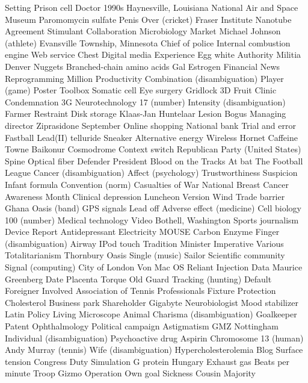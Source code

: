 Setting  Prison cell  Doctor  
1990s  Haynesville, Louisiana  National Air and Space Museum  
Paromomycin sulfate  Penis  Over (cricket)  
Fraser Institute  Nanotube  Agreement  
Stimulant  Collaboration  Microbiology  
Market  Michael Johnson (athlete)  Evansville Township, Minnesota  
Chief of police  Internal combustion engine  Web service  
Chest  Digital media  Experience  
Egg white  Authority  Militia  
Denver Nuggets  Branched-chain amino acids  Gal  
Estrogen  Financial News  Reprogramming  
Million  Productivity  Combination (disambiguation)  
Player (game)  Poster  Toolbox  
Somatic cell  Eye surgery  Gridlock  
3D  Fruit  Clinic  
Condemnation  3G  Neurotechnology  
17 (number)  Intensity (disambiguation)  Farmer  
Restraint  Disk storage  Klaas-Jan Huntelaar  
Lesion  Bogus  Managing director  
Ziprasidone  September  Online shopping  
National bank  Trial and error  Fastball  
Lead(II) telluride  Sneaker  Alternative energy  
Wireless  Hornet  Caffeine  
Towne  Baikonur Cosmodrome  Context switch  
Republican Party (United States)  Spine  Optical fiber  
Defender  President  Blood on the Tracks  
At bat  The Football League  Cancer (disambiguation)  
Affect (psychology)  Trustworthiness  Suspicion  
Infant formula  Convention (norm)  Casualties of War  
National Breast Cancer Awareness Month  Clinical depression  Luncheon  
Version  Wind  Trade barrier  
Ghana  Oasis (band)  GPS signals  
Lead off  Adverse effect (medicine)  Cell biology  
100 (number)  Medical technology  Video  
Bothell, Washington  Sports journalism  Device  
Report  Antidepressant  Electricity  
MOUSE  Carbon  Enzyme  
Finger (disambiguation)  Airway  IPod touch  
Tradition  Minister  Imperative  
Various  Totalitarianism  Thornbury  
Oasis  Single (music)  Sailor  
Scientific community  Signal (computing)  City of London  
Von  Mac OS  Reliant  
Injection  Data  Maurice Greenberg  
Date  Placenta  Torque  
Old  Guard  Tracking (hunting)  
Default  Foreigner  Involved  
Association of Tennis Professionals  Fixture  Protection  
Cholesterol  Business park  Shareholder  
Gigabyte  Neurobiologist  Mood stabilizer  
Latin  Policy  Living  
Microscope  Animal  Charisma (disambiguation)  
Goalkeeper  Patent  Ophthalmology  
Political campaign  Astigmatism  GMZ  
Nottingham  Individual (disambiguation)  Psychoactive drug  
Aspirin  Chromosome 13 (human)  Andy Murray (tennis)  
Wife (disambiguation)  Hypercholesterolemia  Blog  
Surface tension  Congress  Duty  
Simulation  G protein  Hungary  
Exhaust gas  Beats per minute  Troop  
Gizmo  Operation  Own goal  
Sickness  Cousin  Majority  
